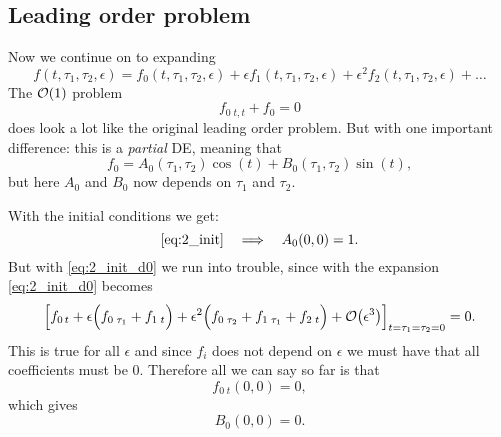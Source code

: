 \documentclass[11pt,letter, swedish, english
]{article}
\begin{document}



\subsection{Leading order problem}
Now we continue on to expanding
\begin{equation}
f(t, \tau_1, \tau_2, \epsilon)=
f_0(t, \tau_1, \tau_2, \epsilon) 
+\epsilon f_1(t, \tau_1, \tau_2, \epsilon) 
+\epsilon^2 f_2(t, \tau_1, \tau_2, \epsilon)+\ldots 
\end{equation}
The $\order{1}$ problem
\begin{equation}
f_{0\;t,t}+f_0=0
\end{equation}
does look a lot like the original leading order problem. But with one
important difference: this is a \emph{partial} DE, meaning that
\begin{equation}\label{eq:2_f0}
f_0=A_0(\tau_1, \tau_2)\cos(t)+B_0(\tau_1, \tau_2)\sin(t),
\end{equation}
but here $A_0$ and $B_0$ now depends on $\tau_1$ and $\tau_2$.

With the initial conditions we get:
\begin{equation}\label{eq:2b_init_A}
\eqref{eq:2_init}\quad\Longrightarrow\quad
A_0(0, 0)=1.
\end{equation}
But with \eqref{eq:2_init_d0} we run into trouble, since
with the expansion \eqref{eq:2_init_d0} becomes
\begin{equation}\label{eq:2_init_d}
\qty[f_{0\,t}+\epsilon\Big(f_{0\;\tau_1}+f_{1\;t} \Big)
+\epsilon^2\Big(f_{0\;\tau_2}+f_{1\;\tau_1}+f_{2\;t} \Big)
+\order{\epsilon^3}]_{t=\tau_1=\tau_2=0}=0.
\end{equation}
This is true for all $\epsilon$ and since $f_i$ does not depend on
$\epsilon$ we must have that all coefficients must be 0. Therefore all
we can say so far is that
\begin{equation}
f_{0\;t}(0, 0)=0, 
\end{equation}
which gives
\begin{equation}\label{eq:2b_init_B}
B_0(0, 0)=0.
\end{equation}
\end{document}
